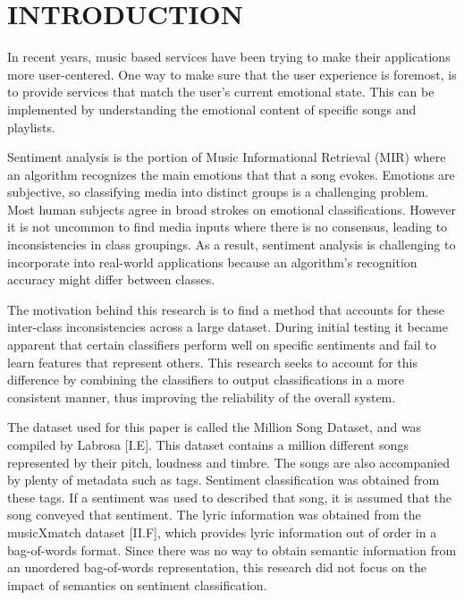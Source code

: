 \renewcommand{\chaptername}{}

\chapter{INTRODUCTION}

In recent years, music based services have been trying to make their 
applications more user-centered. One way to make sure that the 
user experience is foremost, is to provide services that match the user's 
current emotional state. This can be implemented by understanding 
the emotional content of specific songs and playlists. 

Sentiment analysis is the portion of Music Informational Retrieval (MIR) 
where an algorithm recognizes the main emotions that that a song evokes. 
Emotions are subjective, so classifying media into distinct groups 
is a challenging problem. Most human subjects agree in broad 
strokes on emotional classifications. However it is not uncommon
 to find media inputs where there is no consensus, leading to 
 inconsistencies in class groupings. As a result, sentiment analysis 
 is challenging to incorporate into real-world applications 
 because an algorithm's recognition accuracy might differ between classes. 
 
  The motivation behind this research is to find a method that accounts for 
  these inter-class inconsistencies across a large dataset.  During initial 
  testing it became apparent that certain classifiers perform well on specific 
  sentiments and fail to learn features that represent others. This 
  research seeks to account for this difference by combining the classifiers 
  to output classifications in a  more consistent manner, thus improving the 
  reliability of the overall system. 
  
  The dataset used for this paper is called the Million Song Dataset, and 
  was compiled by Labrosa [I.E]. This dataset contains a million different songs
  represented by their pitch, loudness and timbre. The songs are also accompanied 
  by plenty of metadata such as tags. Sentiment classification was obtained from
  these tags. If a sentiment was used to described that song, it is assumed that 
  the song conveyed that sentiment. The lyric information was obtained from the
  musicXmatch dataset  [II.F], which provides lyric information out of order in a 
  bag-of-words format. Since there was no way to obtain semantic information 
  from an unordered bag-of-words representation, this research did not focus 
  on the impact of semantics on sentiment classification. 
      
